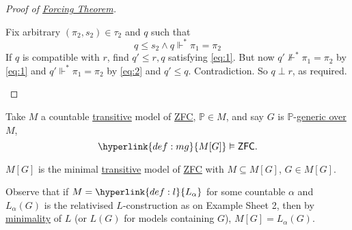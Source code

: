 \documentclass{article}
\newcommand{\1}{\mathbbm{1}}
\let\models\vDash
\let\forces\Vdash
\begin{document}
\begin{proof}[Proof of \hyperlink{thm:forcing}{Forcing Theorem}]
\begin{enumerate}
          Fix arbitrary $(\pi_2,s_2) \in \tau_2$ and $q$ such that
          \begin{equation*}
            q \leq s_2 \land q \forces^* \pi_1 = \pi_2 \tag{$**$} \label{eq:2}
          \end{equation*}
          If $q$ is compatible with $r$, find $q' \leq r,q$ satisfying \eqref{eq:1}.
          But now $q' \not\forces^* \pi_1 = \pi_2$ by \eqref{eq:1} and $q' \forces^* \pi_1 = \pi_2$ by \eqref{eq:2} and $q' \leq q$.
          Contradiction.
          So $q \perp r$, as required. \qedhere
      \end{enumerate}
    \end{proof}

\begin{thm}
  Take $M$ a countable \hyperlink{def:transitive}{transitive} model of \hyperlink{def:axioms}{\textsf{ZFC}}, $\mathbb{P} \in M$, and say $G$ is $\mathbb{P}$-\hyperlink{def:genericO}{generic over} $M$,
  \begin{equation*}
    \hyperlink{def:mg}{M[G]} \models \textsf{ZFC}.
  \end{equation*}
\end{thm}
\begin{cor}
  \hyperlink{def:mg}{$M[G]$} is the minimal \hyperlink{def:transitive}{transitive} model of \hyperlink{def:axioms}{\textsf{ZFC}} with $M \subseteq M[G]$, $G \in M[G]$.
\end{cor}
Observe that if $M = \hyperlink{def:l}{L_\alpha}$ for some countable $\alpha$ and $L_\alpha(G)$ is the relativised $L$-construction as on Example Sheet 2, then by \hyperlink{thm:min}{minimality} of $L$ (or $L(G)$ for models containing $G$), $M[G] = L_\alpha(G)$.
\end{document}
